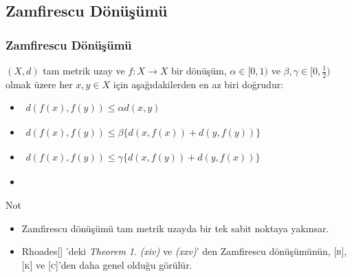 \documentclass[8pt]{beamer}
\begin{document}
\subsection{Zamfirescu D\"{o}n\"{u}\c{s}\"{u}m\"{u}}
\begin{frame}
\frametitle{Zamfirescu D\"{o}n\"{u}\c{s}\"{u}m\"{u}}
 $(X,d)$  tam metrik uzay ve $f: X \rightarrow X$ bir d\"{o}n\"{u}\c{s}\"{u}m, $\alpha \in [0,1)$ ve $\beta , \gamma \in [0,\frac{1}{2}) $ olmak \"{u}zere her $x,y \in X$ i\c{c}in a\c{s}a\u{g}\i dakilerden en az biri do\u{g}rudur:

    \begin{itemize}
    \item $\begin{aligned} d(f(x), f(y))\leq \alpha d(x,y)
      \end{aligned}$
    \item
      $\begin{aligned} d(f(x), f(y))\leq \beta \big\{
        d(x,f(x))+d(y,f(y))\big\}
      \end{aligned}$

    \item
      $\begin{aligned} d(f(x), f(y))\leq \gamma \big\{
        d(x,f(y))+d(y,f(x))\big\}
      \end{aligned}$

    \item  
\end{itemize}

\begin{block}{Not}  
\begin{itemize}[<+-| alert@+>]  
\item Zamfirescu d\"{o}n\"{u}\c{s}\"{u}m\"{u} tam metrik uzayda bir tek sabit noktaya yak\i nsar.  
\item Rhoades[] 'deki \emph{Theorem 1}. \emph{(xiv)} ve \emph{(xxv)}' den   Zamfirescu d\"{o}n\"{u}\c{s}\"{u}m\"{u}n\"{u}n, \textsc{[b]}, \textsc{[k]} ve \textsc{[c]}'den daha genel oldu\u{g}u g\"or\"ul\"ur.
\end{itemize}

\end{block}
\end{frame}%
\end{document}
